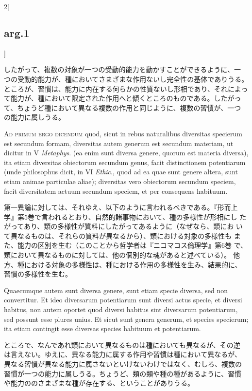 \documentclass[paper=a4paper,fontsize=10pt,jafontsize=9pt,titlepage]{jlreq}
\begin{document}
\begin{paracol}{2}[\subsection{arg.1}]
\switchcolumn

したがって、複数の対象が一つの受動的能力を動かすことができるように、一
つの受動的能力が、種においてさまざまな作用ないし完全性の基体でありうる。
ところが、習慣は、能力に内在する何らかの性質ないし形相であり、それによっ
て能力が、種において限定された作用へと傾くところのものである。したがっ
て、ちょうど種において異なる複数の作用と同じように、複数の習慣が、一つ
の能力に属しうる。

\switchcolumn*[\subsection{ad.1}]

{\scshape Ad primum ergo dicendum} quod, sicut in rebus naturalibus
diversitas specierum est secundum formam, diversitas autem generum est
secundum materiam, ut dicitur in V {\itshape Metaphys}. (ea enim sunt
diversa genere, quorum est materia diversa), ita etiam diversitas
obiectorum secundum genus, facit distinctionem potentiarum (unde
philosophus dicit, in VI {\itshape Ethic}., quod ad ea quae sunt
genere altera, sunt etiam animae particulae aliae); diversitas vero
obiectorum secundum speciem, facit diversitatem actuum secundum
speciem, et per consequens habituum.

\switchcolumn

第一異論に対しては、それゆえ、以下のように言われるべきである。『形而上
学』第5巻で言われるとおり、自然的諸事物において、種の多様性が形相にし
たがってあり、類の多様性が質料にしたがってあるように（なぜなら、類にお
いて異なるものは、それらの質料が異なるから）、類における対象の多様性も
また、能力の区別を生む（このことから哲学者は『ニコマコス倫理学』第6巻
で、類において異なるものに対しては、他の個別的な魂があると述べている）。
他方、種における対象の多様性は、種における作用の多様性を生み、結果的に、
習慣の多様性を生む。

\switchcolumn*

Quaecumque autem sunt diversa genere, sunt etiam specie diversa, sed
non convertitur. Et ideo diversarum potentiarum sunt diversi actus
specie, et diversi habitus, non autem oportet quod diversi habitus
sint diversarum potentiarum, sed possunt esse plures unius. Et sicut
sunt genera generum, et species specierum; ita etiam contingit esse
diversas species habituum et potentiarum.

\switchcolumn

ところで、なんであれ類において異なるものは種においても異なるが、その逆
は言えない。ゆえに、異なる能力に属する作用や習慣は種において異なるが、
異なる習慣が異なる能力に属さないといけないわけではなく、むしろ、複数の
習慣が一つの能力に属しうる。ちょうど、類の類や種の種があるように、習慣
や能力ののさまざまな種が存在する、ということがありうる。


\end{paracol}
\end{document}
